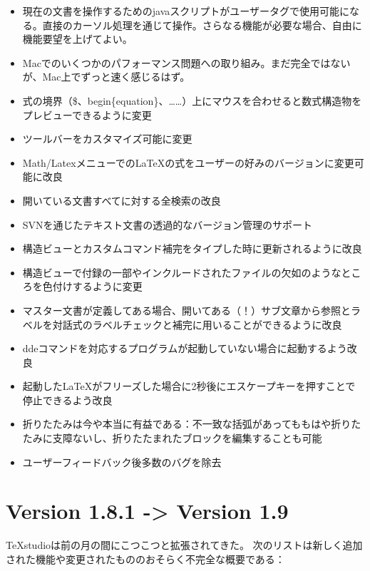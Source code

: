 \documentclass[]{book}
\begin{document}
\begin{itemize}
\item
  現在の文書を操作するためのjavaスクリプトがユーザータグで使用可能になる。直接のカーソル処理を通じて操作。さらなる機能が必要な場合、自由に機能要望を上げてよい。
\item
  Macでのいくつかのパフォーマンス問題への取り組み。まだ完全ではないが、Mac上でずっと速く感じるはず。
\item
  式の境界（\$、begin\{equation\}、\ldots{}\ldots{}）上にマウスを合わせると数式構造物をプレビューできるように変更
\item
  ツールバーをカスタマイズ可能に変更
\item
  Math/LatexメニューでのLaTeXの式をユーザーの好みのバージョンに変更可能に改良
\item
  開いている文書すべてに対する全検索の改良
\item
  SVNを通じたテキスト文書の透過的なバージョン管理のサポート
\item
  構造ビューとカスタムコマンド補完をタイプした時に更新されるように改良
\item
  構造ビューで付録の一部やインクルードされたファイルの欠如のようなところを色付けするように変更
\item
  マスター文書が定義してある場合、開いてある（！）サブ文章から参照とラベルを対話式のラベルチェックと補完に用いることができるように改良
\item
  ddeコマンドを対応するプログラムが起動していない場合に起動するよう改良
\item
  起動したLaTeXがフリーズした場合に2秒後にエスケープキーを押すことで停止できるよう改良
\item
  折りたたみは今や本当に有益である：不一致な括弧があってももはや折りたたみに支障ないし、折りたたまれたブロックを編集することも可能
\item
  ユーザーフィードバック後多数のバグを除去
\end{itemize}

\section{Version 1.8.1 -\textgreater{} Version 1.9}

TeXstudioは前の月の間にこつこつと拡張されてきた。
次のリストは新しく追加された機能や変更されたもののおそらく不完全な概要である：
\end{document}
